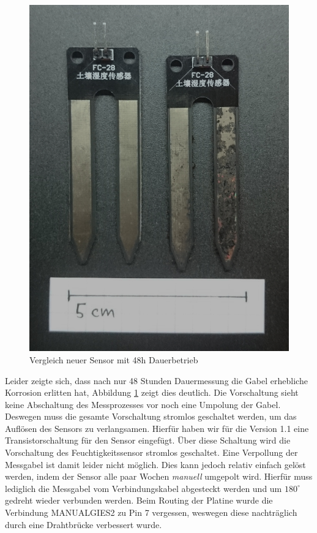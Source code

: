 \documentclass[]{IEEEtran}
\begin{document}
\begin{figure}
	\centering
	\includegraphics[width=0.8\linewidth]{bilder/_fechtesensorVergleich0.jpg}
	\caption{Vergleich neuer Sensor mit 48h Dauerbetrieb}
	\label{fig-SensorVergleich}
\end{figure}
Leider zeigte sich, dass nach nur 48 Stunden Dauermessung die Gabel erhebliche Korrosion erlitten hat, Abbildung \ref{fig-SensorVergleich} zeigt dies deutlich.
Die Vorschaltung sieht keine Abschaltung des Messprozesses vor noch eine Umpolung der Gabel. Deswegen muss die gesamte Vorschaltung stromlos geschaltet werden, um das Auflösen des Sensors zu verlangsamen. Hierfür haben wir für die Version 1.1 eine Transistorschaltung für den Sensor eingefügt. Über diese Schaltung wird die Vorschaltung des Feuchtigkeitssensor stromlos geschaltet. Eine Verpollung der Messgabel ist damit leider nicht möglich. Dies kann jedoch relativ einfach gelöst werden, indem der Sensor alle paar Wochen \emph{manuell} umgepolt wird. Hierfür muss lediglich die Messgabel vom Verbindungskabel abgesteckt werden und um \begin{math}180^{\circ}\end{math} gedreht wieder verbunden werden.
Beim Routing der Platine wurde die Verbindung MANUALGIES2 zu Pin 7 vergessen, weswegen diese nachträglich durch eine Drahtbrücke verbessert wurde.
	
\end{document}
